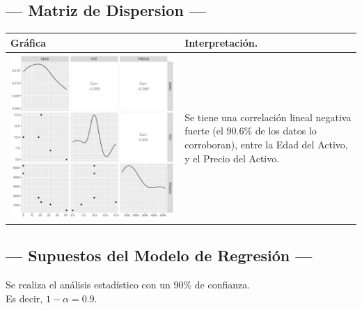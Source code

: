 \subsection{\centering --- Matriz de Dispersion ---} %
\begin{center}
  \begin{tabular}{|p{11cm}|p{5cm}|}
    \hline
    Gráfica & Interpretación. \\ \hline 
    \begin{minipage}{\textwidth}
    \includegraphics[width= 0.5 \linewidth, page=1]{../0.documentos/3_MERGED_MARKET/4_COMPRESOR_AIRE_OIL_FREE/r/Rplots.pdf}
    \end{minipage} 
    &
		Se tiene una correlación lineal negativa fuerte (el \(90.6\%\) de los datos lo corroboran),
		entre la Edad del Activo, y el Precio del Activo.
		\\ \hline 
  \end{tabular}
\end{center} 

\subsection{\centering --- Supuestos del Modelo de Regresión ---} %

Se realiza el análisis estadístico con un \(90\%\) de confianza. \\ 
Es decir, \(1- \alpha = 0.9\).

